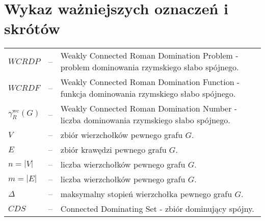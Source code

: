 \chapter*{Wykaz ważniejszych oznaczeń i skrótów}

\begin{tabular}{@{} l l p{} @{}}
    $WCRDP$ & -- & Weakly Connected Roman Domination Problem - problem dominowania rzymskiego słabo spójnego.\\
    $WCRDF$ & -- & Weakly Connected Roman Domination Function - funkcja dominowania rzymskiego słabo spójnego. \\
    $\gamma_{R}^{\text{wc}}(G)$ & -- & Weakly Connected Roman Domination Number - liczba dominowania rzymskiego słabo spójnego. \\
    $V$ & -- & zbiór wierzchołków pewnego grafu $G$.\\
    $E$ & -- & zbiór krawędzi pewnego grafu $G$.\\
    $n = |V|$ & -- & liczba wierzchołków pewnego grafu $G$.\\
    $m = |E|$ & -- & liczba wierzchołków pewnego grafu $G$.\\
    $\Delta$ & -- & maksymalny stopień wierzchołka pewnego grafu $G$.\\
    $CDS$ & -- & Connected Dominating Set - zbiór dominujący spójny.\\
\end{tabular}
